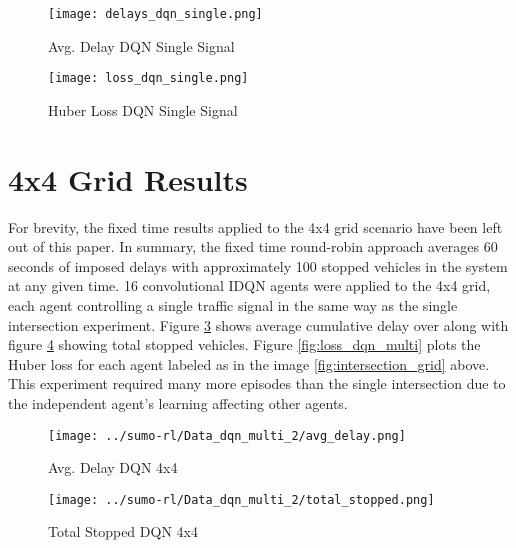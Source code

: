 \documentclass[letterpaper]{article} %
\begin{document}
\begin{figure}[htbp]
  \centering
  \texttt{[image: delays\_dqn\_single.png]}
  \caption{Avg. Delay DQN Single Signal}
  \label{fig:delays_dqn_single}
\end{figure}


\begin{figure}[htbp]
  \centering
  \texttt{[image: loss\_dqn\_single.png]}
  \caption{Huber Loss DQN Single Signal}
  \label{fig:loss_dqn_single}
\end{figure}

\section{4x4 Grid Results}
For brevity, the fixed time results applied to the 4x4 grid scenario have been left out of this paper.
In summary, the fixed time round-robin approach averages 60 seconds of imposed delays with approximately 100 stopped vehicles in the system at any given time.
16 convolutional IDQN agents were applied to the 4x4 grid, each agent controlling a single traffic signal in the same way as the single intersection experiment.
Figure \ref{fig:delays_dqn_multi} shows average cumulative delay over along with figure \ref{fig:total_stopped_dqn_multi} showing total stopped vehicles.
Figure \ref{fig:loss_dqn_multi} plots the Huber loss for each agent labeled as in the image \ref{fig:intersection_grid} above.
This experiment required many more episodes than the single intersection due to the independent agent's learning affecting other agents.

\begin{figure}[htbp]
  \centering
  \texttt{[image: ../sumo-rl/Data\_dqn\_multi\_2/avg\_delay.png]}
  \caption{Avg. Delay DQN 4x4}
  \label{fig:delays_dqn_multi}
\end{figure}

\begin{figure}[htbp]
  \centering
  \texttt{[image: ../sumo-rl/Data\_dqn\_multi\_2/total\_stopped.png]}
  \caption{Total Stopped DQN 4x4}
  \label{fig:total_stopped_dqn_multi}
\end{figure}
\end{document}
